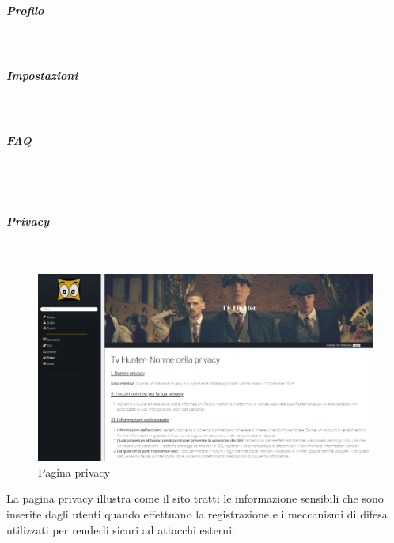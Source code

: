\subparagraph{Profilo}
~\\


\subparagraph{Impostazioni} 
~\\

\subparagraph{FAQ} 
~\\

~\\
\subparagraph{Privacy}
~\\

\begin{figure}[H]
	\centerline{\includegraphics[scale= 0.4]{img/privacy.png}}
	\caption{Pagina privacy}
	
\end{figure}
La pagina privacy illustra come il sito tratti le informazione sensibili che sono inserite dagli utenti quando effettuano la registrazione e i meccanismi di difesa utilizzati per renderli sicuri ad attacchi esterni. 




